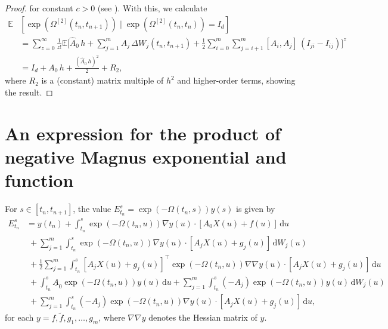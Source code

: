 \documentclass[onefignum]{siamart250211}
\begin{document}
\begin{proof}
for constant $c>0$ (see \cite[page 191]{KloedenPlaten1999}). With this, we calculate
\begin{align*}
\mathbb{E}&\left[\exp\left(\Omega^{[2]}(t_n,t_{n+1})\right)\mid\exp\left(\Omega^{[2]}(t_n,t_n)\right)=I_d\right]\\
&=\sum_{z=0}^\infty\frac{1}{z!}\mathbb{E}\bigg[\hat{A}_0\,h+\sum_{j=1}^mA_j\,\Delta W_j(t_n,t_{n+1})+\frac{1}{2}\sum_{i=0}^m\sum_{j=i+1}^m[A_i,A_j]\,(I_{ji}-I_{ij})\bigg]^z\\
&=I_d+A_0\,h+\frac{\left(\hat{A}_0\,h\right)^2}{2}+R_2,
\end{align*}
where $R_2$ is a (constant) matrix multiple of $h^2$ and higher-order terms, showing the result.
\end{proof}


\section[Componentwise It\^o expansion]{An expression for the product of negative Magnus exponential and function}\label{ProofofNewLemma4}

\begin{lemma}\label{NewLemma4}
For $s\in[t_n,t_{n+1}]$, the value $E_{t_n}^s=\exp(-\Omega(t_n,s))y(s)$ is given by
\begin{align}
E_{t_n}^s&=y(t_n)+\int_{t_n}^s\exp(-\Omega(t_n,u))\nabla y(u)\!\cdot\![A_0X(u)+f(u)]\,\mathrm{d}u\nonumber\\
&\;+\sum_{j=1}^m\int_{t_n}^s\exp(-\Omega(t_n,u))\nabla y(u)\!\cdot\![A_jX(u)+g_j(u)]\,\mathrm{d}W_j(u)\label{ExpNegOmegatns}\\
&\;+\frac{1}{2}\sum_{j=1}^m\int_{t_n}^s[A_jX(u)+g_j(u)]^\intercal\exp(-\Omega(t_n,u))\nabla\nabla y(u)\!\cdot\![A_jX(u)+g_j(u)]\,\mathrm{d}u\nonumber\\
&\;+\int_{t_n}^s\underline{A}_0\exp(-\Omega(t_n,u))y(u)\,\mathrm{d}u+\sum_{j=1}^m\int_{t_n}^s(-A_j)\exp(-\Omega(t_n,u))y(u)\,\mathrm{d}W_j(u)\nonumber\\
&\;+\sum_{j=1}^m\int_{t_n}^s(-A_j)\exp(-\Omega(t_n,u))\nabla y(u)\!\cdot\![A_jX(u)+g_j(u)]\,\mathrm{d}u,\nonumber
\end{align}
for each $y=f,\tilde{f},g_1,\ldots,g_m$, where $\nabla\nabla y$ denotes the Hessian matrix of $y$.
\end{lemma}
\end{document}
